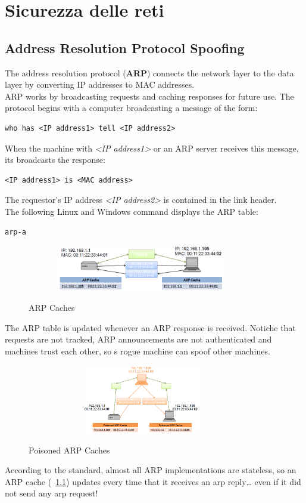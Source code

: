 \chapter{Sicurezza delle reti}
\section{Address Resolution Protocol Spoofing}
The address resolution protocol (\textbf{ARP}) connects the network layer to the data layer by converting IP addresses to MAC addresses. \\
ARP works by broadcasting requests and caching responses for future use. The protocol begins with a computer broadcasting a message of the form: 
\begin{lstlisting}
who has <IP address1> tell <IP address2>
\end{lstlisting}
When the machine with \textit{<IP address1>} or an ARP server receives this message, its broadcasts the response:
\begin{lstlisting}
<IP address1> is <MAC address>
\end{lstlisting}
The requestor's IP address \textit{<IP address2>} is contained in the link header.\\
The following Linux and Windows command displays the ARP table:
\begin{lstlisting}
arp-a
\end{lstlisting}
\begin{figure}[htbp]
	\centering%
	\subfigure%
	{\includegraphics[height=2cm, width=10cm, keepaspectratio]{Immagini/Capitolo11/ARP_Caches.png}}
	\caption{ARP Caches\label{fig:ARP_Caches}} 	
\end{figure}
The ARP table is updated whenever an ARP response is received. Notiche that requests are not tracked, ARP announcements are not authenticated and machines trust each other, so s rogue machine can spoof other machines.\begin{figure}[htbp]
	\centering%
	\subfigure%
	{\includegraphics[height=3cm, width=10cm, keepaspectratio]{Immagini/Capitolo11/Poisoned_ARP_Caches.png}}
	\caption{Poisoned ARP Caches\label{fig:Poisoned_ARP_Caches}} 	
\end{figure}
According to the standard, almost all ARP implementations are stateless, so an ARP cache (\figurename ~\ref{fig:ARP_Caches}) updates every time that it receives an arp reply… even if it did not send any arp request!

